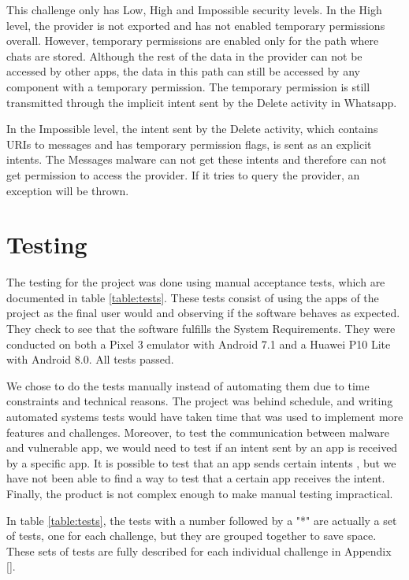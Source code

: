     This challenge only has Low, High and Impossible security levels. In the High level, the provider is not exported and has not enabled temporary permissions overall. However, temporary permissions are enabled only for the path where chats are stored. Although the rest of the data in the provider can not be accessed by other apps, the data in this path can still be accessed by any component with a temporary permission. The temporary permission is still transmitted through the implicit intent sent by the Delete activity in Whatsapp.
    
    In the Impossible level, the intent sent by the Delete activity, which contains URIs to messages and has temporary permission flags, is sent as an explicit intents. The Messages malware can not get these intents and therefore can not get permission to access the provider. If it tries to query the provider, an exception will be thrown.
    
    \section{Testing}
        \label{sec:testing}
        
    The testing for the project was done using manual acceptance tests, which are documented in table \ref{table:tests}. These tests consist of using the apps of the project as the final user would and observing if the software behaves as expected. They check to see that the software fulfills the System Requirements. They were conducted on both a Pixel 3 emulator with Android 7.1 and a Huawei P10 Lite with Android 8.0. All tests passed.
    
    We chose to do the tests manually instead of automating them due to time constraints and technical reasons. The project was behind schedule, and writing automated systems tests would have taken time that was used to implement more features and challenges. Moreover, to test the communication between malware and vulnerable app, we would need to test if an intent sent by an app is received by a specific app. It is possible to test that an app sends certain intents \cite{testing_intents}, but we have not been able to find a way to test that a certain app receives the intent. Finally, the product is not complex enough to make manual testing impractical.
    
    In table \ref{table:tests}, the tests with a number followed by a "*" are actually a set of tests, one for each challenge, but they are grouped together to save space. These sets of tests are fully described for each individual challenge in Appendix \ref{}.
    

